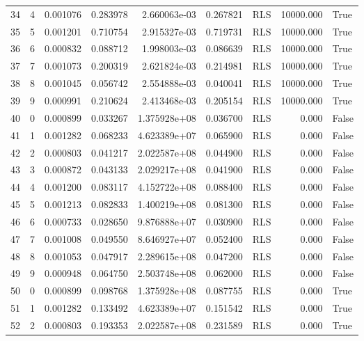\documentclass[12pt]{article}
\begin{document}
\begin{longtable}{lrrrrrlrl}
		34 &       4 &   0.001076 &  0.283978 &  2.660063e-03 &  0.267821 &    RLS &  10000.000 &   True \\
		35 &       5 &   0.001201 &  0.710754 &  2.915327e-03 &  0.719731 &    RLS &  10000.000 &   True \\
		36 &       6 &   0.000832 &  0.088712 &  1.998003e-03 &  0.086639 &    RLS &  10000.000 &   True \\
		37 &       7 &   0.001073 &  0.200319 &  2.621824e-03 &  0.214981 &    RLS &  10000.000 &   True \\
		38 &       8 &   0.001045 &  0.056742 &  2.554888e-03 &  0.040041 &    RLS &  10000.000 &   True \\
		39 &       9 &   0.000991 &  0.210624 &  2.413468e-03 &  0.205154 &    RLS &  10000.000 &   True \\
		40 &       0 &   0.000899 &  0.033267 &  1.375928e+08 &  0.036700 &    RLS &      0.000 &  False \\
		41 &       1 &   0.001282 &  0.068233 &  4.623389e+07 &  0.065900 &    RLS &      0.000 &  False \\
		42 &       2 &   0.000803 &  0.041217 &  2.022587e+08 &  0.044900 &    RLS &      0.000 &  False \\
		43 &       3 &   0.000872 &  0.043133 &  2.029217e+08 &  0.041900 &    RLS &      0.000 &  False \\
		44 &       4 &   0.001200 &  0.083117 &  4.152722e+08 &  0.088400 &    RLS &      0.000 &  False \\
		45 &       5 &   0.001213 &  0.082833 &  1.400219e+08 &  0.081300 &    RLS &      0.000 &  False \\
		46 &       6 &   0.000733 &  0.028650 &  9.876888e+07 &  0.030900 &    RLS &      0.000 &  False \\
		47 &       7 &   0.001008 &  0.049550 &  8.646927e+07 &  0.052400 &    RLS &      0.000 &  False \\
		48 &       8 &   0.001053 &  0.047917 &  2.289615e+08 &  0.047200 &    RLS &      0.000 &  False \\
		49 &       9 &   0.000948 &  0.064750 &  2.503748e+08 &  0.062000 &    RLS &      0.000 &  False \\
		50 &       0 &   0.000899 &  0.098768 &  1.375928e+08 &  0.087755 &    RLS &      0.000 &   True \\
		51 &       1 &   0.001282 &  0.133492 &  4.623389e+07 &  0.151542 &    RLS &      0.000 &   True \\
		52 &       2 &   0.000803 &  0.193353 &  2.022587e+08 &  0.231589 &    RLS &      0.000 &   True \\

\end{longtable}
\end{document}
